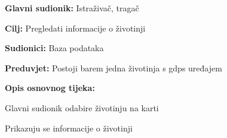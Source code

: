 					\noindent {}
					\begin{packed_item}
	
						\item \textbf{Glavni sudionik: } Istraživač, tragač
						\item  \textbf{Cilj:} Pregledati informacije o životinji
						\item  \textbf{Sudionici:} Baza podataka
						\item  \textbf{Preduvjet:} Postoji barem jedna životinja s gdps uređajem
						\item  \textbf{Opis osnovnog tijeka:}
						
						\item[] \begin{packed_enum}
	
							\item Glavni sudionik odabire životinju na karti
							\item	Prikazuju se informacije o životinji
						
						\end{packed_enum}
					\end{packed_item}
				
